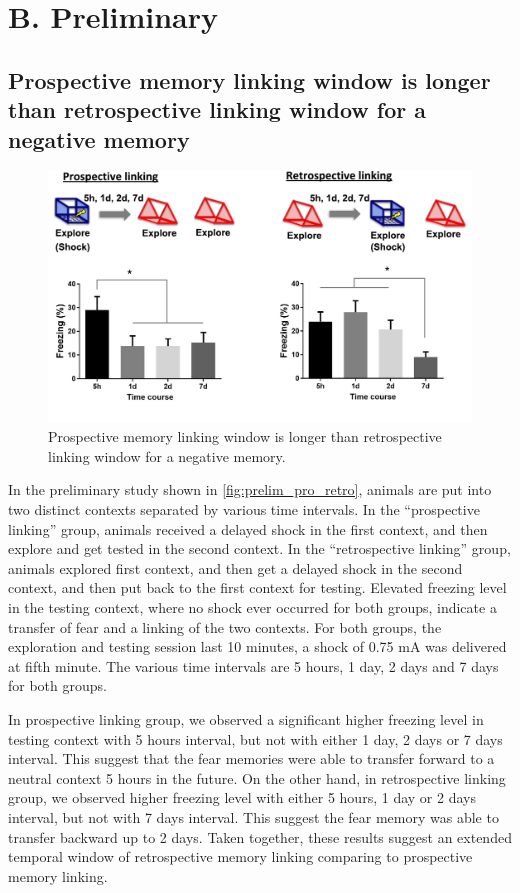\documentclass[master.tex]{subfiles}
\begin{document}
\section*{B. Preliminary}

\subsection*{Prospective memory linking window is longer than retrospective
  linking window for a negative memory}

\begin{figure}
  \centering \includegraphics[scale = .4]{Figures/pro_retro_prelim.pdf}
  \caption{\footnotesize Prospective memory linking window is longer than
    retrospective linking window for a negative memory.}
  \label{fig:prelim_pro_retro}
\end{figure}

In the preliminary study shown in \autoref{fig:prelim_pro_retro}, animals are
put into two distinct contexts separated by various time intervals. In the
``prospective linking'' group, animals received a delayed shock in the first
context, and then explore and get tested in the second context. In the
``retrospective linking'' group, animals explored first context, and then get a
delayed shock in the second context, and then put back to the first context for
testing. Elevated freezing level in the testing context, where no shock ever
occurred for both groups, indicate a transfer of fear and a linking of the two
contexts. For both groups, the exploration and testing session last 10 minutes,
a shock of 0.75 mA was delivered at fifth minute. The various time intervals are
5 hours, 1 day, 2 days and 7 days for both groups.

In prospective linking group, we observed a significant higher freezing level in
testing context with 5 hours interval, but not with either 1 day, 2 days or 7
days interval. This suggest that the fear memories were able to transfer forward
to a neutral context 5 hours in the future. On the other hand, in retrospective
linking group, we observed higher freezing level with either 5 hours, 1 day or 2
days interval, but not with 7 days interval. This suggest the fear memory was
able to transfer backward up to 2 days. Taken together, these results suggest an
extended temporal window of retrospective memory linking comparing to
prospective memory linking.
\end{document}
